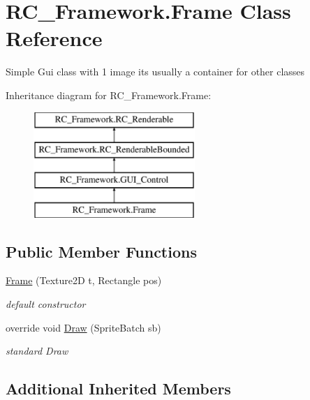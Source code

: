 \hypertarget{class_r_c___framework_1_1_frame}{}\section{R\+C\+\_\+\+Framework.\+Frame Class Reference}
\label{class_r_c___framework_1_1_frame}


Simple Gui class with 1 image its usually a container for other classes  


Inheritance diagram for R\+C\+\_\+\+Framework.\+Frame\+:\begin{figure}[H]
\begin{center}
\leavevmode
\includegraphics[height=4.000000cm]{class_r_c___framework_1_1_frame}
\end{center}
\end{figure}
\subsection*{Public Member Functions}
\begin{DoxyCompactItemize}
\item 
\mbox{\hyperlink{class_r_c___framework_1_1_frame_a9003d73a746ddb0cc3d0588830efb22d}{Frame}} (Texture2D t, Rectangle pos)
\begin{DoxyCompactList}\small\item\em default constructor \end{DoxyCompactList}\item 
override void \mbox{\hyperlink{class_r_c___framework_1_1_frame_ac27d7d9f33b34045c4dc90287f3eacee}{Draw}} (Sprite\+Batch sb)
\begin{DoxyCompactList}\small\item\em standard Draw \end{DoxyCompactList}\end{DoxyCompactItemize}
\subsection*{Additional Inherited Members}


